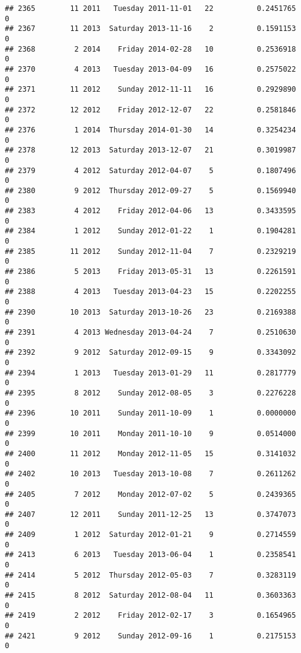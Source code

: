 \documentclass[
]{article}
\begin{document}
\begin{verbatim}
## 2365        11 2011   Tuesday 2011-11-01   22          0.2451765             0
## 2367        11 2013  Saturday 2013-11-16    2          0.1591153             0
## 2368         2 2014    Friday 2014-02-28   10          0.2536918             0
## 2370         4 2013   Tuesday 2013-04-09   16          0.2575022             0
## 2371        11 2012    Sunday 2012-11-11   16          0.2929890             0
## 2372        12 2012    Friday 2012-12-07   22          0.2581846             0
## 2376         1 2014  Thursday 2014-01-30   14          0.3254234             0
## 2378        12 2013  Saturday 2013-12-07   21          0.3019987             0
## 2379         4 2012  Saturday 2012-04-07    5          0.1807496             0
## 2380         9 2012  Thursday 2012-09-27    5          0.1569940             0
## 2383         4 2012    Friday 2012-04-06   13          0.3433595             0
## 2384         1 2012    Sunday 2012-01-22    1          0.1904281             0
## 2385        11 2012    Sunday 2012-11-04    7          0.2329219             0
## 2386         5 2013    Friday 2013-05-31   13          0.2261591             0
## 2388         4 2013   Tuesday 2013-04-23   15          0.2202255             0
## 2390        10 2013  Saturday 2013-10-26   23          0.2169388             0
## 2391         4 2013 Wednesday 2013-04-24    7          0.2510630             0
## 2392         9 2012  Saturday 2012-09-15    9          0.3343092             0
## 2394         1 2013   Tuesday 2013-01-29   11          0.2817779             0
## 2395         8 2012    Sunday 2012-08-05    3          0.2276228             0
## 2396        10 2011    Sunday 2011-10-09    1          0.0000000             0
## 2399        10 2011    Monday 2011-10-10    9          0.0514000             0
## 2400        11 2012    Monday 2012-11-05   15          0.3141032             0
## 2402        10 2013   Tuesday 2013-10-08    7          0.2611262             0
## 2405         7 2012    Monday 2012-07-02    5          0.2439365             0
## 2407        12 2011    Sunday 2011-12-25   13          0.3747073             0
## 2409         1 2012  Saturday 2012-01-21    9          0.2714559             0
## 2413         6 2013   Tuesday 2013-06-04    1          0.2358541             0
## 2414         5 2012  Thursday 2012-05-03    7          0.3283119             0
## 2415         8 2012  Saturday 2012-08-04   11          0.3603363             0
## 2419         2 2012    Friday 2012-02-17    3          0.1654965             0
## 2421         9 2012    Sunday 2012-09-16    1          0.2175153             0

\end{verbatim}
\end{document}
